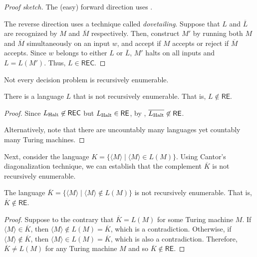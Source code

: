 \documentclass[11pt,usenames, dvipsnames]{article}
\begin{document}
\begin{proof}[Proof sketch]
  The (easy) forward direction uses .
  
  The reverse direction uses a technique called \emph{dovetailing}. Suppose that $L$ and $\overline{L}$ are recognized by $M$ and $\overline{M}$ respectively. Then, construct $M'$ by running both $M$ and $\overline{M}$ simultaneously on an input $w$, and accept if $M$ accepts or reject if $\overline{M}$ accepts. Since $w$ belongs to either $L$ or $\overline{L}$, $M'$ halts on all inputs and $L = L(M')$. Thus, $L \in \textsf{REC}$.
\end{proof}

Not every decision problem is recursively enumerable.

\begin{theorem}
  There is a language $L$ that is not recursively enumerable. That is, $L \not\in \textsf{RE}$.
\end{theorem}

\begin{proof}
  Since $L\textsubscript{Halt} \not\in \textsf{REC}$ but $L\textsubscript{Halt} \in \textsf{RE}$, by , $\overline{L\textsubscript{Halt}} \not\in \textsf{RE}$.

  Alternatively, note that there are uncountably many languages yet countably many Turing machines.
\end{proof}

Next, consider the language $K = \{\langle M \rangle \mid \langle M \rangle \in L(M)\}$. Using Cantor's diagonalization technique, we can establish that the complement $\overline{K}$ is not recursively enumerable.

\begin{theorem}
  The language $\overline{K} = \{\langle M \rangle \mid \langle M \rangle \not\in L(M)\}$ is not recursively enumerable. That is, $\overline{K} \notin \textsf{RE}$.
\end{theorem}

\begin{proof}
  Suppose to the contrary that $\overline{K} = L(M)$ for some Turing machine $M$. If $\langle M \rangle \in \overline{K}$, then $\langle M \rangle \not\in L(M) = \overline{K}$, which is a contradiction. Otherwise, if $\langle M \rangle \not\in \overline{K}$, then $\langle M \rangle \in L(M) = \overline{K}$, which is also a contradiction. Therefore, $\overline{K} \ne L(M)$ for any Turing machine $M$ and so $\overline{K} \notin \textsf{RE}$.
\end{proof}
\end{document}

